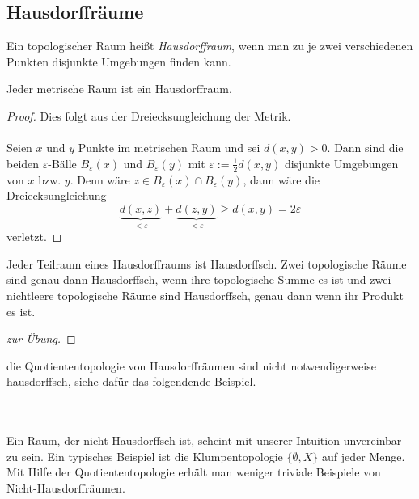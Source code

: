 \documentclass[a4paper,10pt]{scrartcl}
\newcommand{\eps}{\varepsilon}
\begin{document}
\subsection{Hausdorffräume}
\begin{df}
 Ein topologischer Raum heißt \emph{Hausdorffraum}, wenn man zu je zwei verschiedenen Punkten disjunkte Umgebungen finden kann.
\\ \fixme[fig13]
\end{df}
\begin{st}
Jeder metrische Raum ist ein Hausdorffraum. 
\end{st}
\begin{proof}
Dies folgt aus der Dreiecksungleichung der Metrik. \\
 \fixme[fig14] \\
Seien $x$ und $y$ Punkte im metrischen Raum und sei $d(x,y)>0$.
Dann sind die beiden $\eps$-Bälle $B_\eps(x)$ und $B_\eps(y)$ mit $\eps:=\frac{1}{2}d(x,y)$ disjunkte Umgebungen von $x$ bzw. $y$. Denn 
wäre $z\in B_\eps(x) \cap B_\eps(y)$, dann wäre die Dreiecksungleichung
\[
\underbrace{d(x,z)}_{<\eps}+\underbrace{d(z,y)}_{<\eps}\ge d(x,y)=2\eps
\]        
verletzt.
\end{proof}
\begin{st}
Jeder Teilraum eines Hausdorffraums ist Hausdorffsch. Zwei topologische Räume sind genau dann Hausdorffsch, wenn ihre topologische Summe es ist und zwei nichtleere topologische Räume sind Hausdorffsch, genau dann wenn ihr Produkt es ist. 
\end{st}
\begin{proof}[zur Übung]\end{proof}
\begin{note*}
die Quotiententopologie von Hausdorffräumen sind nicht notwendigerweise hausdorffsch, siehe dafür das folgendende Beispiel. \\
\end{note*}
\fixme[fig15]\\
 \\
Ein Raum, der nicht Hausdorffsch ist, scheint mit unserer Intuition unvereinbar zu sein.  Ein typisches Beispiel ist die Klumpentopologie $\{\emptyset, X\}$ auf jeder Menge. Mit Hilfe der Quotiententopologie erhält man weniger triviale Beispiele von Nicht-Hausdorffräumen.
\end{document}
